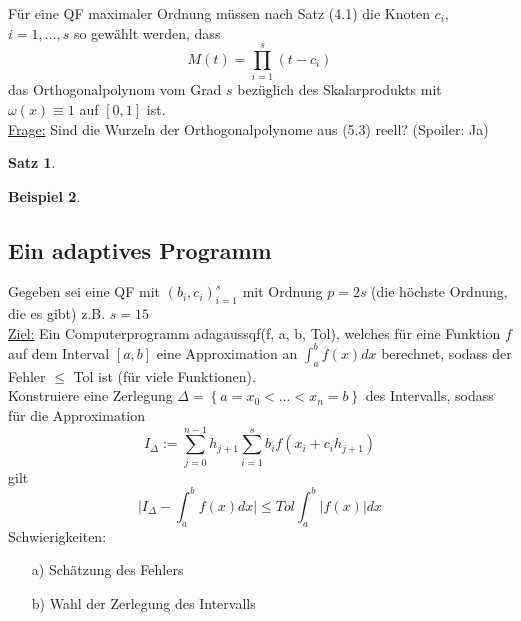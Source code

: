 \documentclass[12pt]{article}
\theoremstyle{break}
\newtheorem{theorem}{Satz}[subsection]
\newtheorem{example}[theorem]{Beispiel}
\begin{document}
Für eine QF maximaler Ordnung müssen nach Satz (4.1) die Knoten $c_i$, $i=1, ...,s$ so gewählt werden, dass 
$$M(t) = \prod_{i=1}^s(t-c_i)$$
das Orthogonalpolynom vom Grad $s$ bezüglich des Skalarprodukts mit $\omega(x) \equiv 1$ auf $[0,1]$ ist. \\
\underline{Frage:} Sind die Wurzeln der Orthogonalpolynome aus (5.3) reell? (Spoiler: Ja)

\begin{theorem}

\end{theorem}

\begin{example}

\end{example}

\subsection{Ein adaptives Programm}

Gegeben sei eine QF mit $(b_i, c_i)_{i=1}^s$ mit Ordnung $p=2s$ (die höchste Ordnung, die es gibt) z.B. $s=15$ \\
\underline{Ziel:} Ein Computerprogramm adagaussqf(f, a, b, Tol), welches für eine Funktion $f$ auf dem Interval $[a, b]$ eine Approximation an $\int_a^b f(x) dx$ berechnet, sodass der Fehler $\leq$ Tol ist (für viele Funktionen). \\
Konstruiere eine Zerlegung $\Delta = \left\{ a = x_0 < ... < x_n = b\right\}$ des Intervalls, sodass für die Approximation 
$$I_\Delta := \sum_{j=0}^{n-1} h_{j+1} \sum_{i=1}^s b_if(x_i + c_ih_{j+1})$$
gilt 
$$\vert I_\Delta - \int_a^b f(x) dx \vert \leq Tol \int_a^b \vert f(x) \vert dx $$
Schwierigkeiten:

\begin{enumerate}
  \item[a)] Schätzung des Fehlers
  \item[b)] Wahl der Zerlegung des Intervalls 
\end{enumerate}
\end{document}
